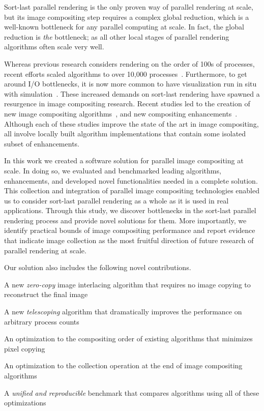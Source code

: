 \documentclass{sig-alternate}
\newcommand*{\lcite}[1]{~\cite{#1}}
\newenvironment{packed_itemize}{
\begin{itemize}
  \setlength{\topsep}{0pt}
  \setlength{\itemsep}{0pt}
  \setlength{\parskip}{0pt}
  \setlength{\parsep}{0pt}
  \setlength{\partopsep}{0pt}
}{\end{itemize}}
\begin{document}
Sort-last parallel rendering is the only proven way of parallel rendering
at scale, but its image compositing step requires a complex global reduction, 
which is a well-known bottleneck for any parallel computing at scale.
In fact, the global reduction is \textit{the} bottleneck; as all other local 
stages of parallel rendering algorithms often scale very well.

Whereas previous research considers rendering on the
order of 100s of processes, recent efforts scaled algorithms to over 10,000
processes\lcite{Peterka2009,Childs2010,Howison2010}.  
Furthermore, to get around I/O bottlenecks, it is now more common to have
visualization run in situ with
simulation\lcite{Ma2009:SciDACReview,Ma2009:CG&A,Yu2010,Tu2006}.
These increased demands on sort-last rendering have spawned a resurgence 
in image compositing research.  
Recent studies led to the creation of new image compositing 
algorithms\lcite{23Swap,RadixK}, and new compositing
enhancements\lcite{Kendall2010}.  Although each of these studies improve
the state of the art in image compositing, all involve locally built
algorithm implementations that contain some isolated subset of
enhancements.  

In this work we created a software solution for parallel image compositing 
at scale. In doing so, we evaluated and benchmarked leading algorithms,
enhancements, and developed novel functionalities needed in
a complete solution.
This collection and
integration of parallel image compositing technologies enabled us to
consider sort-last parallel rendering as a whole as it is used in real
applications. Through this study, we discover bottlenecks in the
sort-last parallel rendering process and provide novel solutions for them.
More importantly, we identify practical bounds of image compositing
performance and report evidence that indicate image collection as 
the most fruitful direction of future research of parallel rendering
at scale.

Our solution also includes the following novel contributions.
\begin{packed_itemize}
\item A new \textit{zero-copy} image interlacing algorithm that requires 
no image copying to reconstruct the final image
\item A new \textit{telescoping} algorithm that dramatically improves 
the performance on arbitrary process counts
\item An optimization to the compositing order of existing algorithms 
that minimizes pixel copying
\item An optimization to the collection operation at the end of image 
compositing algorithms
\item A \textit{unified and reproducible} benchmark that compares 
algorithms using all of these optimizations
\end{packed_itemize}
\end{document}
